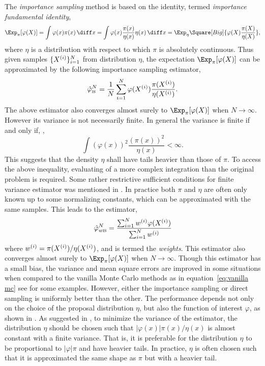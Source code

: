 The \emph{importance sampling} method is based on the identity, termed
\emph{importance fundamental identity},
\begin{equation}
  \Exp_{\pi}[\varphi(X)]
  = \int\varphi(x)\pi(x)\intd x
  = \int\varphi(x)\frac{\pi(x)}{\eta(x)}\eta(x)\intd x
  = \Exp_{\eta}\Square[Big]{\varphi(X)\frac{\pi(X)}{\eta(X)}},
\end{equation}
where $\eta$ is a distribution with respect to which $\pi$ is absolutely
continuous. Thus given \iid samples $\{X^{(i)}\}_{i=1}^N$ from distribution
$\eta$, the expectation $\Exp_{\pi}[\varphi(X)]$ can be approximated by the
following importance sampling estimator,
\begin{equation}
  \hat\varphi_{\text{\textsc{is}}}^N
  = \frac{1}{N}\sum_{i=1}^N\varphi(X^{(i)})\frac{\pi(X^{(i)})}{\eta(X^{(i)})}.
\end{equation}
The above estimator also converges almost surely to $\Exp_{\pi}[\varphi(X)]$
when $N\to\infty$. However its variance is not necessarily finite. In general
the variance is finite if and only if,
\cite[][sec.~3.3.2]{Robert:2004tn},
\begin{equation}
  \int(\varphi(x))^2\frac{(\pi(x))^2}{\eta(x)} < \infty.
\end{equation}
This suggests that the density $\eta$ shall have tails heavier than those of
$\pi$. To access the above inequality, evaluating of a more complex
integration than the original problem is required. Some rather restrictive
sufficient conditions for finite variance estimator was mentioned in
\cite{Geweke:1989tm}. In practice both $\pi$ and $\eta$ are often only known
up to some normalizing constants, which can be approximated with the same
samples. This leads to the estimator,
\begin{equation}
  \hat\varphi_{w\text{\textsc{is}}}^N
  = \frac{\sum_{i=1}^Nw^{(i)}\varphi(X^{(i)})}{\sum_{i=1}^Nw^{(i)}}
\end{equation}
where $w^{(i)} = \pi(X^{(i)})/\eta(X^{(i)})$, and is termed the \emph{weights}. This
estimator also converges almost surely to $\Exp_{\pi}[\varphi(X)]$ when
$N\to\infty$. Though this estimator has a small bias, the variance and mean
square errors are improved in some situations when compared to the vanilla
Monte Carlo methods as in equation~\eqref{eq:vanilla mc} see
\cite{Casella:1998tj} for some examples. However, either the importance
sampling or direct sampling is uniformly better than the other. The
performance depends not only on the choice of the proposal distribution
$\eta$, but also the function of interest $\varphi$, as shown in
\cite{Casella:1998tj}. As suggested in \cite[][sec.~3.3.2]{Robert:2004tn}, to
minimize the variance of the estimator, the distribution $\eta$ should be
chosen such that $|\varphi(x)|\pi(x)/\eta(x)$ is almost constant with a finite
variance. That is, it is preferable for the distribution $\eta$ to be
proportional to $|\varphi|\pi$ and have heavier tails. In practice, $\eta$ is
often chosen such that it is approximated the same shape as $\pi$ but with a
heavier tail.

